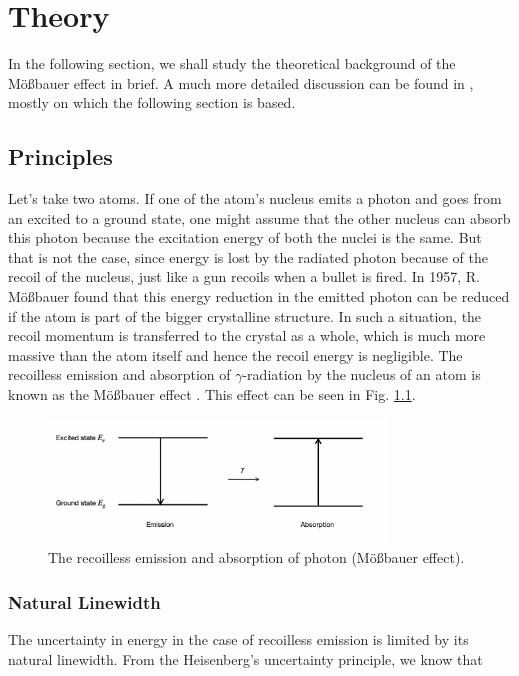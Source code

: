 \documentclass[a4paper]{report}
\numberwithin{equation}{section}
\begin{document}
\chapter{Theory}
In the following section, we shall study the theoretical background of the M\"o{\ss}bauer effect in brief. A much more detailed discussion can be found in \cite{Schatz1996}, mostly on which the following section is based.

\section{Principles} \label{sec:principles}

Let's take two atoms. If one of the atom's nucleus emits a photon and goes from an excited to a ground state, one might assume that the other nucleus can absorb this photon because the excitation energy of both the nuclei is the same. But that is not the case, since energy is lost by the radiated photon because of the recoil of the nucleus, just like a gun recoils when a bullet is fired. In 1957, R. M\"o{\ss}bauer found that this energy reduction in the emitted photon can be reduced if the atom is part of the bigger crystalline structure. In such a situation, the recoil momentum is transferred to the crystal as a whole, which is much more massive than the atom itself and hence the recoil energy is negligible. The recoilless emission and absorption of $\gamma $-radiation by the nucleus of an atom is known as the M\"o{\ss}bauer effect \cite{Schatz1996}. This effect can be seen in Fig. \ref{fig:moess}.

\begin{figure}[htpb]
    \centering
    \includegraphics[width=0.8\textwidth]{moessbauer-effect}
    \caption{The recoilless emission and absorption of photon (M\"o{\ss}bauer effect).}
    \label{fig:moess}
\end{figure}

\subsection{Natural Linewidth}
The uncertainty in energy in the case of recoilless emission is limited by its natural linewidth. From the Heisenberg's uncertainty principle, we know that 
\end{document}
